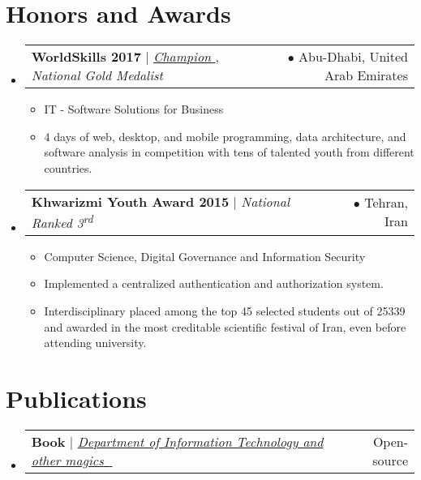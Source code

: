 \documentclass[letterpaper,11pt]{article}
\makeatletter
\let\orighref\href
\renewcommand{\href}[2]{\orighref{#1}{#2\,{\textsuperscript{\tiny{\faExternalLink}}}}}
\newcommand{\deemph}[1]{{\color{black!40}#1}}
\newcommand{\resumeItem}[1]{
  \item\small{
    {#1 \vspace{-2pt}}
  }
}
\newcommand{\resumeProjectHeading}[2]{
    \item
    \begin{tabular*}{0.97\textwidth}{l@{\extracolsep{\fill}}r}
      \small#1 & #2 \\
    \end{tabular*}\vspace{-7pt}
}
\newcommand{\resumeSubHeadingListStart}{\begin{itemize}[leftmargin=0.15in, label={}]}
\newcommand{\resumeSubHeadingListEnd}{\end{itemize}}
\newcommand{\resumeItemListStart}{\begin{itemize}}
\newcommand{\resumeItemListEnd}{\end{itemize}\vspace{-5pt}}
\makeatother
\begin{document}
\section{Honors and Awards}
    \resumeSubHeadingListStart
      \resumeProjectHeading
          {\textbf{WorldSkills 2017} $|$ \href{https://www.credly.com/badges/4333ef3c-2cf8-43f3-a102-33ffb50ba6f2/public_url}{\emph{Champion}}, \emph{National Gold Medalist}}{$\bullet$ Abu-Dhabi, United Arab Emirates}
          \resumeItemListStart
            \resumeItem{IT - Software Solutions for Business}
            \resumeItem{4 days of web, desktop, and mobile programming, data architecture, and software analysis in competition with tens of talented youth from different countries.}
          \resumeItemListEnd
      \resumeProjectHeading
          {\textbf{Khwarizmi Youth Award 2015} $|$ \emph{National Ranked 3\textsuperscript{rd}}}{$\bullet$ Tehran, Iran}
          \resumeItemListStart
            \resumeItem{Computer Science, Digital Governance and Information Security}
            \resumeItem{Implemented a centralized authentication and authorization system.}
            \resumeItem{Interdisciplinary placed among the top 45 selected students out of 25339 and awarded in the most creditable scientific festival of Iran, even before attending university.}
          \resumeItemListEnd
    \resumeSubHeadingListEnd

\section{Publications}
    \resumeSubHeadingListStart
    
      \resumeProjectHeading
          {\textbf{Book} $|$ \href{https://tayyebi.github.io/devops-book/}{\emph{Department of Information Technology and other magics }}}{\deemph{Open-source}}

    \resumeSubHeadingListEnd

\end{document}
